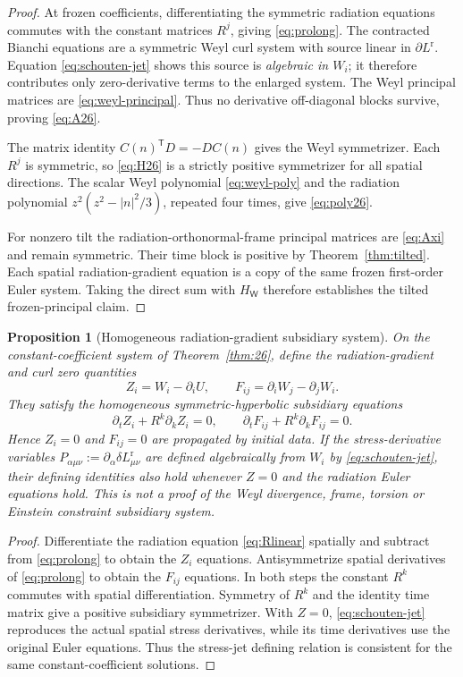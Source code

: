 \documentclass[11pt,a4paper]{article}
\newtheorem{proposition}{Proposition}
\begin{document}
\begin{proof}
At frozen coefficients, differentiating
the symmetric radiation equations
commutes with the constant matrices
$R^j$, giving \eqref{eq:prolong}.
The contracted Bianchi equations
are a symmetric Weyl curl system
with source linear in
$\partial L^{\mathrm r}$.
Equation \eqref{eq:schouten-jet}
shows this source is
\emph{algebraic in $W_i$};
it therefore contributes
only zero-derivative terms
to the enlarged system.
The Weyl principal matrices
are \eqref{eq:weyl-principal}.
Thus no derivative off-diagonal
blocks survive, proving
\eqref{eq:A26}.

The matrix identity
$C(n)^{\mathsf T}D=-DC(n)$
gives the Weyl symmetrizer.
Each $R^j$ is symmetric,
so \eqref{eq:H26} is a
strictly positive symmetrizer
for all spatial directions.
The scalar Weyl polynomial
\eqref{eq:weyl-poly} and
the radiation polynomial
$z^2(z^2-|n|^2/3)$,
repeated four times,
give \eqref{eq:poly26}.

For nonzero tilt the
radiation-orthonormal-frame
principal matrices are
\eqref{eq:Axi} and remain
symmetric. Their time block
is positive by
Theorem~\ref{thm:tilted}.
Each spatial radiation-gradient
equation is a copy of the
same frozen first-order Euler
system. Taking the direct sum
with $H_{\mathsf W}$ therefore
establishes the tilted
frozen-principal claim.
\end{proof}

\begin{proposition}[Homogeneous
radiation-gradient subsidiary system]
\label{prop:W-sub}
On the constant-coefficient
system of Theorem~\ref{thm:26},
define the radiation-gradient
and curl zero quantities
\[
Z_i=W_i-\partial_iU,\qquad
F_{ij}=\partial_iW_j-
\partial_jW_i .
\]
They satisfy the \emph{homogeneous}
symmetric-hyperbolic
subsidiary equations
\begin{equation}\label{eq:W-sub}
\boxed{\quad
\partial_tZ_i+R^k\partial_kZ_i=0,\qquad
\partial_tF_{ij}+R^k\partial_kF_{ij}=0 .
\quad}
\end{equation}
Hence $Z_i=0$ and $F_{ij}=0$
are propagated by initial data.
If the stress-derivative variables
$P_{\alpha\mu\nu}:=
\partial_\alpha\delta L^{\mathrm r}_{\mu\nu}$
are defined algebraically from
$W_i$ by \eqref{eq:schouten-jet},
their defining identities also
hold whenever $Z=0$ and the
radiation Euler equations hold.
This is \emph{not} a proof of
the Weyl divergence, frame,
torsion or Einstein constraint
subsidiary system.
\end{proposition}
\begin{proof}
Differentiate the radiation equation
\eqref{eq:Rlinear} spatially and
subtract from \eqref{eq:prolong}
to obtain the $Z_i$ equations.
Antisymmetrize spatial derivatives
of \eqref{eq:prolong} to obtain
the $F_{ij}$ equations. In both
steps the constant $R^k$
commutes with spatial
differentiation. Symmetry of
$R^k$ and the identity time matrix
give a positive subsidiary
symmetrizer. With $Z=0$,
\eqref{eq:schouten-jet} reproduces
the actual spatial stress
derivatives, while its time
derivatives use the original
Euler equations. Thus the
stress-jet defining relation
is consistent for the same
constant-coefficient solutions.
\end{proof}
\end{document}
